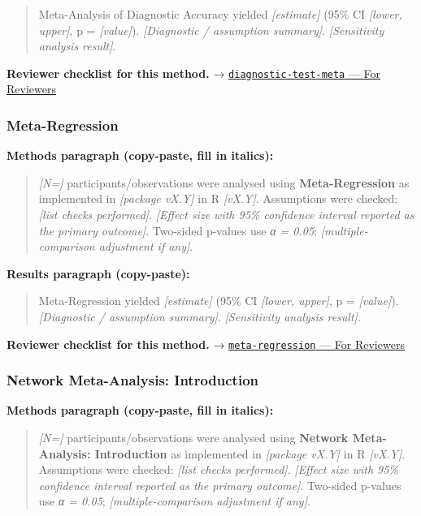 \documentclass[
]{article}
\begin{document}
\begin{quote}
Meta-Analysis of Diagnostic Accuracy yielded \emph{{[}estimate{]}} (95\%
CI \emph{{[}lower, upper{]}}, p = \emph{{[}value{]}}).
\emph{{[}Diagnostic / assumption summary{]}}. \emph{{[}Sensitivity
analysis result{]}}.
\end{quote}

\textbf{Reviewer checklist for this method.} →
\href{../chapters/15-metaanalysis/diagnostic-test-meta.Rmd\#for-reviewers}{\texttt{diagnostic-test-meta}
--- For Reviewers}

\subsubsection{Meta-Regression}\label{meta-regression}

\textbf{Methods paragraph (copy-paste, fill in italics):}

\begin{quote}
\emph{{[}N={]}} participants/observations were analysed using
\textbf{Meta-Regression} as implemented in \emph{{[}package vX.Y{]}} in
R \emph{{[}vX.Y{]}}. Assumptions were checked: \emph{{[}list checks
performed{]}}. \emph{{[}Effect size with 95\% confidence interval
reported as the primary outcome{]}}. Two-sided p-values use \emph{α =
0.05}; \emph{{[}multiple-comparison adjustment if any{]}}.
\end{quote}

\textbf{Results paragraph (copy-paste):}

\begin{quote}
Meta-Regression yielded \emph{{[}estimate{]}} (95\% CI \emph{{[}lower,
upper{]}}, p = \emph{{[}value{]}}). \emph{{[}Diagnostic / assumption
summary{]}}. \emph{{[}Sensitivity analysis result{]}}.
\end{quote}

\textbf{Reviewer checklist for this method.} →
\href{../chapters/15-metaanalysis/meta-regression.Rmd\#for-reviewers}{\texttt{meta-regression}
--- For Reviewers}

\subsubsection{Network Meta-Analysis:
Introduction}\label{network-meta-analysis-introduction}

\textbf{Methods paragraph (copy-paste, fill in italics):}

\begin{quote}
\emph{{[}N={]}} participants/observations were analysed using
\textbf{Network Meta-Analysis: Introduction} as implemented in
\emph{{[}package vX.Y{]}} in R \emph{{[}vX.Y{]}}. Assumptions were
checked: \emph{{[}list checks performed{]}}. \emph{{[}Effect size with
95\% confidence interval reported as the primary outcome{]}}. Two-sided
p-values use \emph{α = 0.05}; \emph{{[}multiple-comparison adjustment if
any{]}}.
\end{quote}
\end{document}
